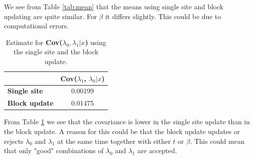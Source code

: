 We see from Table \ref{tab:mean} that the means using single site and block updating are quite similar. For $\beta$ it differs slightly. This could be due to computational errors. 

\begin{table}[]
\centering
\begin{tabular}{lc}
                      & \textbf{Cov($\lambda_1$, $\lambda_0|x$)} \\ \hline
\textbf{Single site}  & 0.00199                            \\
\textbf{Block update} & 0.01475                           
\end{tabular}
\caption{Estimate for \textbf{Cov($\lambda_0, \lambda_1|x$)} using the single site and the block update.}
\label{tab:cov}
\end{table}

From Table \ref{tab:cov} we see that the covariance is lower in the single site update than in the block update. A reason for this could be that the block update updates or rejects $\lambda_0$ and $\lambda_1$ at the same time together with either $t$ or $\beta$. This could mean that only "good" combinations of $\lambda_0$ and $\lambda_1$ are accepted. 





